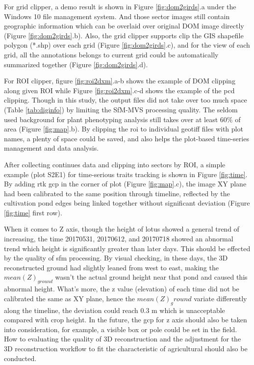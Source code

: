\documentclass{configs/bmcart}
\begin{document}
For grid clipper, a demo result is shown in Figure \ref{fig:dom2girds}.a under the Windows 10 file management system. And those sector images still contain geographic information which can be overlaid over original DOM image directly (Figure \ref{fig:dom2girds}.b). Also, the grid clipper supports clip the GIS shapefile polygon (*.shp) over each grid (Figure \ref{fig:dom2girds}.c), and for the view of each grid, all the annotations belongs to current grid could be automatically summarized together (Figure \ref{fig:dom2girds}.d).

For ROI clipper, figure \ref{fig:roi2dxm}.a-b shows the example of DOM clipping along given ROI while Figure \ref{fig:roi2dxm}.c-d shows the example of the \acrshort*{pcd} clipping. Though in this study, the output files did not take over too much space (Table \ref{tab:diginfo}) by limiting the SfM-MVS processing quality. The seldom used background for plant phenotyping analysis still takes over at least 60\% of area (Figure \ref{fig:map}.b). By clipping the \acrshort*{roi} to individual geotiff files with plot names, a plenty of space could be saved, and also helps the plot-based time-series management and data analysis. 

After collecting continues data and clipping into sectors by ROI, a simple example (plot S2E1) for time-serious traits tracking is shown in Figure \ref{fig:time}. By adding \acrfull*{rtk} \acrfull*{gcp} in the corner of plot (Figure \ref{fig:map}.c), the image XY plane had been calibrated to the same position through timeline, reflected by the cultivation pond edges being linked together without significant deviation (Figure \ref{fig:time} first row). 

When it comes to Z axis, though the height of lotus showed a general trend of increasing, the time 20170531, 20170612, and 20170718 showed an abnormal trend which height is significantly greater than later days. This should be effected by the quality of \acrfull*{sfm} processing. By visual checking, in these days, the 3D reconstructed ground had slightly leaned from west to east, making the $mean(Z)_{ground}$ wasn't the actual ground height near that pond and caused this abnormal height. What's more, the z value (elevation) of each time did not be calibrated the same as XY plane, hence the $mean(Z)_ground$ variate differently along the timeline, the deviation could reach 0.3 m which is unacceptable compared with crop height. In the future, the \acrshort*{gcp} for z axis should also be taken into consideration, for example, a visible box or pole could be set in the field. How to evaluating the quality of 3D reconstruction and the adjustment for the 3D reconstruction workflow to fit the characteristic of agricultural should also be conducted.
\end{document}
